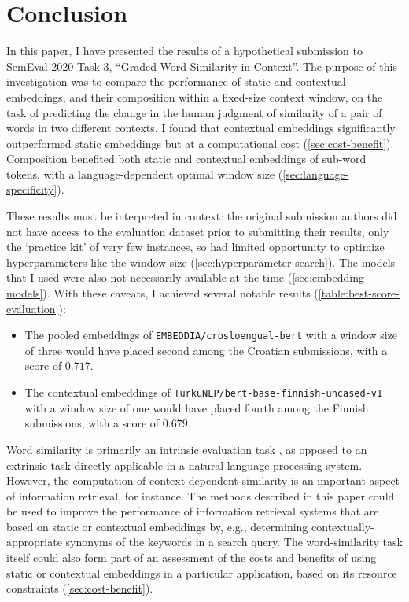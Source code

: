 \section{Conclusion}
\label{sec:conclusion}

In this paper, I have presented the results of a hypothetical submission to
SemEval-2020 Task 3, ``Graded Word Similarity in Context''.
The purpose of this investigation was to compare the performance of static and
contextual embeddings, and their composition within a fixed-size context window, on the
task of predicting the change in the human judgment of similarity of a pair of words in
two different contexts.
I found that contextual embeddings significantly outperformed static embeddings but at
a computational cost (\cref{sec:cost-benefit}).
Composition benefited both static and contextual embeddings of sub-word tokens, with a
language-dependent optimal window size (\cref{sec:language-specificity}).

These results must be interpreted in context: the original submission authors did not
have access to the evaluation dataset prior to submitting their results, only the
`practice kit' of very few instances, so had limited opportunity to optimize
hyperparameters like the window size (\cref{sec:hyperparameter-search}).
The models that I used were also not necessarily available at the time
(\cref{sec:embedding-models}).
With these caveats, I achieved several notable results (\cref{table:best-score-evaluation}):
\begin{itemize}
  \item The pooled embeddings of \texttt{EMBEDDIA/crosloengual-bert} with a window
        size of three would have placed second among the Croatian submissions, with a
        score of $0.717$.
  \item The contextual embeddings of \texttt{TurkuNLP/bert-base-finnish-uncased-v1}
        with a window size of one would have placed fourth among the Finnish
        submissions, with a score of $0.679$.
\end{itemize}

Word similarity is primarily an intrinsic evaluation task \parencite[1281]{Lenci2022},
as opposed to an extrinsic task directly applicable in a natural language processing
system.
However, the computation of context-dependent similarity is an important aspect of
information retrieval, for instance.
The methods described in this paper could be used to improve the performance of
information retrieval systems that are based on static or contextual embeddings by,
e.g., determining contextually-appropriate synonyms of the keywords in a search query.
The word-similarity task itself could also form part of an assessment of the costs and
benefits of using static or contextual embeddings in a particular application, based on
its resource constraints (\cref{sec:cost-benefit}).
